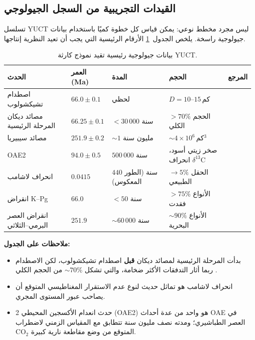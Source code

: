 \documentclass[11pt,a4paper]{article}
\begin{document}
	\subsection{القيدات التجريبية من السجل الجيولوجي}
	
	تسلسل YUCT ليس مجرد مخطط نوعي: يمكن قياس كل خطوة كميًا باستخدام بيانات جيولوجية راسخة. يلخص الجدول~\ref{tab:geodata} الأرقام الرئيسية التي يجب أن تعيد النظرية إنتاجها.
	
	\begin{table}[H]
		\centering
		\small
		\caption{بيانات جيولوجية رئيسية تقيد نموذج كارثة YUCT.}
		\label{tab:geodata}
		\begin{tabular}{@{}p{4.2cm} p{2.6cm} p{2.8cm} p{4.2cm} p{1.2cm}@{}}
			\toprule
			\textbf{الحدث} & \textbf{العمر (Ma)} & \textbf{المدة} & \textbf{الحجم} & \textbf{المرجع} \\
			\midrule
			اصطدام تشيكشولوب & \(66.0 \pm 0.1\) & لحظي & \(D = 10\)–\(15\) كم & \cite{Schulte2010} \\
			مصائد ديكان المرحلة الرئيسية & \(66.25 \pm 0.1\) & \(<30\,000\) سنة & \(>70\%\) الحجم الكلي & \cite{Schoene2019} \\
			مصائد سيبيريا & \(251.9 \pm 0.2\) & \(\sim 1\) مليون سنة & \(\sim 4\times10^6\) كم\(^3\) & \cite{SiberianTraps} \\
			OAE2 & \(94.0 \pm 0.5\) & \(500\,000\) سنة & صخر زيتي أسود، انحراف \(\delta^{13}\)C & \cite{Jenkyns2010} \\
			انحراف لاشامب & \(0.0415\) & \(440\) سنة (الطور المعكوس) & الحقل \(\to 5\%\) الطبيعي & \cite{Laschamp} \\
			انقراض K–Pg & \(66.0\) & \(<50\) سنة & \(>75\%\) الأنواع فقدت & \cite{Schulte2010} \\
			انقراض العصر البرمي–الثلاثي & \(251.9\) & \(\sim 60\,000\) سنة & \(\sim 90\%\) الأنواع البحرية & \cite{Burgess2014} \\
			\bottomrule
		\end{tabular}
	\end{table}
	
	\noindent
	\textbf{ملاحظات على الجدول:}
	\begin{itemize}
		\item بدأت المرحلة الرئيسية لمصائد ديكان \textbf{قبل} اصطدام تشيكشولوب، لكن الاصطدام ربما أثار التدفقات الأكثر ضخامة، والتي تشكل \(\sim 70\%\) من الحجم الكلي \cite{DeccanTriggering}.
		\item انحراف لاشامب هو تماثل حديث لنوع عدم الاستقرار المغناطيسي المتوقع أن يصاحب عبور المستوى المجري.
		\item حدث انعدام الأكسجين المحيطي 2 (OAE2) هو واحد من عدة أحداث OAE في العصر الطباشيري؛ ومدته نصف مليون سنة تتطابق مع المقياس الزمني لاضطراب CO\(_2\) المتوقع من وضع مقاطعة نارية كبيرة.
	\end{itemize}
	
\end{document}

